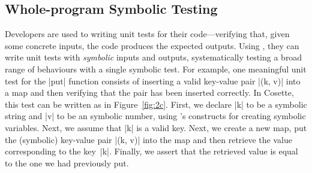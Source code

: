 

\vspace*{-0.2cm}
\subsection{Whole-program Symbolic Testing}
\label{subsec:st}

Developers are used to writing unit tests for their code---verifying that, given some concrete inputs, the code produces the expected outputs. Using \cosette, they can write unit tests with \emph{symbolic} inputs and outputs, systematically testing a broad range of behaviours with a single symbolic test. For example, one meaningful unit test for the \jsinline|put| function consists of inserting a valid key-value pair \jsinline|(k, v)| into a map and then verifying that the pair has been inserted correctly. In Cosette, this test can be written as in Figure~\ref{fig:2c}. First, we declare \jsinline|k| to be a symbolic string and \jsinline|v| to be an symbolic number, using \cosette's constructs for creating symbolic variables. Next, we assume that \jsinline|k| is a valid key. Next, we create a new map, put the (symbolic) key-value pair \jsinline|(k, v)| into the map and then retrieve the value corresponding to the key~\jsinline|k|. Finally, we assert that the retrieved value is equal to the one we had previously put.

